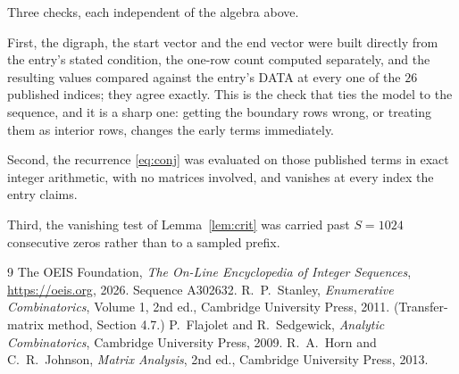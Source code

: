 \documentclass[11pt,a4paper]{article}
\theoremstyle{plain}
\theoremstyle{definition}
\begin{document}
Three checks, each independent of the algebra above.

First, the digraph, the start vector and the end vector were built directly from the
entry's stated condition, the one-row count computed separately, and the resulting values
compared against the entry's DATA at every one of the $26$ published indices; they
agree exactly. This is the check that ties the model to the sequence, and it is a sharp one:
getting the boundary rows wrong, or treating them as interior rows, changes the early terms
immediately.

Second, the recurrence \eqref{eq:conj} was evaluated on those published terms in exact
integer arithmetic, with no matrices involved, and vanishes at every index the entry claims.

Third, the vanishing test of Lemma~\ref{lem:crit} was carried past $S=1024$ consecutive
zeros rather than to a sampled prefix.

\begin{thebibliography}{9}
 The OEIS Foundation, \emph{The On-Line Encyclopedia of Integer
Sequences}, \url{https://oeis.org}, 2026. Sequence A302632.
 R.~P.~Stanley, \emph{Enumerative Combinatorics}, Volume 1, 2nd ed.,
Cambridge University Press, 2011. (Transfer-matrix method, Section 4.7.)
 P.~Flajolet and R.~Sedgewick, \emph{Analytic Combinatorics}, Cambridge
University Press, 2009.
 R.~A.~Horn and C.~R.~Johnson, \emph{Matrix Analysis}, 2nd ed., Cambridge
University Press, 2013.
\end{thebibliography}
\end{document}
